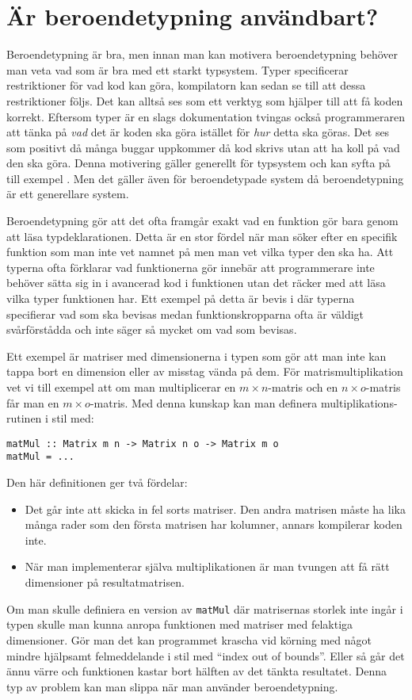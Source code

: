 \section{Är beroendetypning användbart?}
Beroendetypning är bra, men innan man kan motivera beroendetypning behöver man
veta vad som är bra med ett starkt typsystem.
Typer specificerar restriktioner för vad kod kan göra, kompilatorn kan sedan se
till att dessa restriktioner följs. Det kan alltså ses som ett verktyg som
hjälper till att få koden korrekt. Eftersom typer är en slags dokumentation
tvingas också programmeraren att tänka på
\emph{vad} det är koden ska göra istället för \emph{hur} detta ska göras. Det
ses som positivt då många buggar uppkommer då kod skrivs utan att ha koll på
vad den ska göra. Denna motivering gäller generellt för typsystem och kan syfta
på till exempel \haskell{}. Men det gäller även för beroendetypade system då
beroendetypning är ett generellare system.

Beroendetypning gör att det ofta framgår exakt vad en funktion gör bara genom
att läsa typdeklarationen. Detta är en stor fördel när man söker efter en
specifik funktion som man inte vet namnet på men man vet vilka typer den ska
ha. Att typerna ofta förklarar vad funktionerna gör innebär att programmerare
inte behöver sätta sig in i avancerad kod i funktionen utan det räcker med att
läsa vilka typer funktionen har. Ett exempel på detta är bevis i \coq{} där
typerna specifierar vad som ska bevisas medan funktionskropparna ofta är
väldigt svårförstådda och inte säger så mycket om vad som bevisas.

Ett exempel är matriser med dimensionerna i typen som gör att man inte kan
tappa bort en dimension eller av misstag vända på dem. För matrismultiplikation
vet vi till exempel att om man multiplicerar en $m \times n$-matris och en $n
\times o$-matris får man en $m \times o$-matris. Med denna kunskap kan man
definera multiplikations-rutinen i stil med:

\begin{verbatim}
matMul :: Matrix m n -> Matrix n o -> Matrix m o
matMul = ...
\end{verbatim}

Den här definitionen ger två fördelar:

\begin{itemize}
  \item Det går inte att skicka in fel sorts matriser. Den andra matrisen måste
    ha lika många rader som den första matrisen har kolumner, annars kompilerar
    koden inte.
  \item När man implementerar själva multiplikationen är man tvungen att få rätt
    dimensioner på resultatmatrisen.
\end{itemize}

Om man skulle definiera en version av \verb+matMul+ där matrisernas storlek
inte ingår i typen skulle man kunna anropa funktionen med matriser med
felaktiga dimensioner. Gör man det kan programmet krascha vid körning med något
mindre hjälpsamt felmeddelande i stil med ``index out of bounds''. Eller så går
det ännu värre och funktionen kastar bort hälften av det tänkta resultatet.
Denna typ av problem kan man slippa när man använder beroendetypning.
